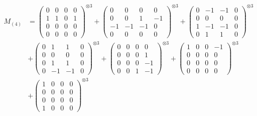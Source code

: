 \documentclass{article}
\newcommand{\Mthree}{%
    M_{(4)}
}
\begin{document}
        \newpage
        
        \footnotesize{
        \begin{align}
        \Mthree
        &= \label{Rs16-Rc11-Solution-4-c1} \begin{pmatrix} 0 & 0 & 0 & 0 \\ 1 & 1 & 0 & 1 \\ 0 & 0 & 0 & 0 \\ 0 & 0 & 0 & 0 \end{pmatrix}^{\otimes 3} 
            + \begin{pmatrix} 0 & 0 & 0 & 0 \\ 0 & 0 & 1 & -1 \\ -1 & -1 & -1 & 0 \\ 0 & 0 & 0 & 0 \end{pmatrix}^{\otimes 3} 
            + \begin{pmatrix} 0 & -1 & -1 & 0 \\ 0 & 0 & 0 & 0 \\ 1 & -1 & -1 & 0 \\ 0 & 1 & 1 & 0 \end{pmatrix}^{\otimes 3} \\
        &+ \label{Rs16-Rc11-Solution-4-c4} \begin{pmatrix} 0 & 1 & 1 & 0 \\ 0 & 0 & 0 & 0 \\ 0 & 1 & 1 & 0 \\ 0 & -1 & -1 & 0 \end{pmatrix}^{\otimes 3} 
            + \begin{pmatrix} 0 & 0 & 0 & 0 \\ 0 & 0 & 0 & 1 \\ 0 & 0 & 0 & -1 \\ 0 & 0 & 1 & -1 \end{pmatrix}^{\otimes 3} 
            + \begin{pmatrix} 1 & 0 & 0 & -1 \\ 0 & 0 & 0 & 0 \\ 0 & 0 & 0 & 0 \\ 0 & 0 & 0 & 0 \end{pmatrix}^{\otimes 3} \\
        &+ \label{Rs16-Rc11-Solution-4-c7} \begin{pmatrix} 1 & 0 & 0 & 0 \\ 0 & 0 & 0 & 0 \\ 0 & 0 & 0 & 0 \\ 1 & 0 & 0 & 0 \end{pmatrix}^{\otimes 3} 

\end{align}}
\end{document}
